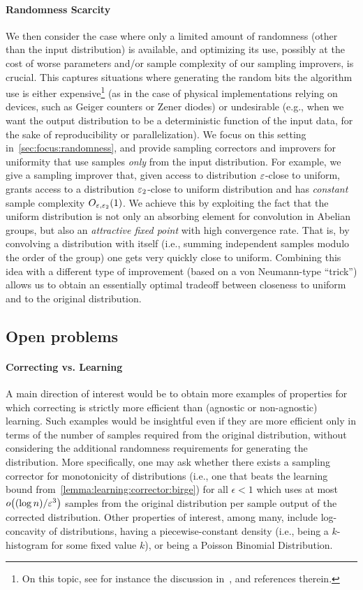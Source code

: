  \paragraph{Randomness Scarcity}
We {then} consider the case where only a limited amount of randomness (other than the input distribution) is available, and optimizing its use, possibly at the cost of worse parameters and/or sample complexity of our sampling improvers, is crucial. This captures situations where generating the random bits the algorithm use is either expensive\footnote{On this topic, see for instance the discussion in~\cite{KR:94,IZ:89}, and references therein.} (as in the case of physical implementations relying on devices, such as Geiger counters or Zener diodes) or undesirable  (e.g., when we want the output distribution to be a deterministic function of the input data, for the sake of reproducibility or parallelization). We focus on this setting in~\cref{sec:focus:randomness}, and provide sampling correctors and improvers for uniformity that use samples \emph{only} from the input distribution. For example, we give a sampling improver that, given access to distribution $\varepsilon$-close to uniform, grants access to a distribution $\varepsilon_2$-close to uniform distribution and has \emph{constant} sample complexity $O_{\varepsilon, \varepsilon_2}(1)$. We achieve this by exploiting the fact that the uniform distribution is not only an absorbing element for convolution in Abelian groups, but also an \emph{attractive fixed point} with high convergence rate. That is, by convolving a distribution with itself (i.e., summing independent samples modulo the order of the group) one gets very quickly close to uniform. Combining this idea with a different type of improvement (based on a von Neumann-type ``trick'') allows us to obtain an essentially optimal tradeoff between closeness to uniform and to the original distribution. 


\subsection{Open problems}

\paragraph{Correcting vs. Learning}
A main direction of
interest would be to obtain more examples of 
properties for which correcting is strictly more efficient than 
(agnostic or non-agnostic) learning.   Such examples would be
insightful even if they are more efficient only
in terms of the number of samples 
required from the original distribution, 
without considering the additional randomness requirements for
generating the distribution.
More specifically, one may ask whether 
there exists a 
sampling corrector for 
monotonicity of 
distributions (i.e., one that beats the learning bound from~\cref{lemma:learning:corrector:birge})
for all $\epsilon<1$ which uses at most
$\littleO{(\log n)/\eps^3}$ samples from the original distribution per sample
output of the corrected distribution. {Other properties of interest, among many, include log-concavity of distributions, having a piecewise-constant density (i.e., being a $k$-histogram for some fixed value $k$), or being a Poisson Binomial Distribution.}

